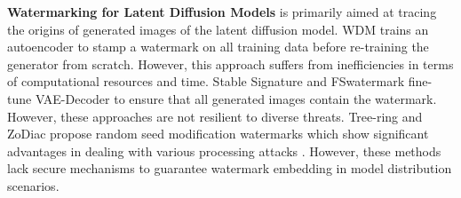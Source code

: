 


\noindent\textbf{Watermarking for Latent Diffusion Models} is primarily aimed at tracing the origins of generated images of the latent diffusion model. WDM \cite{zhao2023recipe} trains an autoencoder to stamp a watermark on all training data before re-training the generator from scratch. However, this approach suffers from inefficiencies in terms of computational resources and time. Stable Signature \cite{fernandez2023stable} and FSwatermark \cite{xiong2023flexible} fine-tune VAE-Decoder to ensure that all generated images contain the watermark. However, these approaches are not resilient to diverse threats. Tree-ring \cite{wen2023tree} and ZoDiac \cite{zhang2024robust} propose random seed modification watermarks which show significant advantages in dealing with various processing attacks \cite{an2024benchmarking}. However, these methods lack secure mechanisms to guarantee watermark embedding in model distribution scenarios. 

